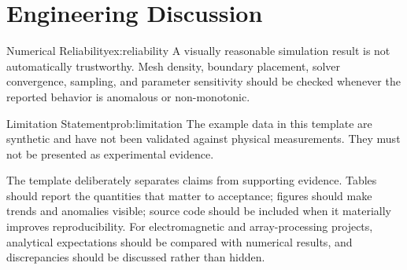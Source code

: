 \section{Engineering Discussion}

\begin{example}{Numerical Reliability}{ex:reliability}
A visually reasonable simulation result is not automatically trustworthy. Mesh density,
boundary placement, solver convergence, sampling, and parameter sensitivity should be checked
whenever the reported behavior is anomalous or non-monotonic.
\end{example}

\begin{problem}{Limitation Statement}{prob:limitation}
The example data in this template are synthetic and have not been validated against physical
measurements. They must not be presented as experimental evidence.
\end{problem}

The template deliberately separates claims from supporting evidence. Tables should report the
quantities that matter to acceptance; figures should make trends and anomalies visible; source
code should be included when it materially improves reproducibility. For electromagnetic and
array-processing projects, analytical expectations should be compared with numerical results,
and discrepancies should be discussed rather than hidden.

